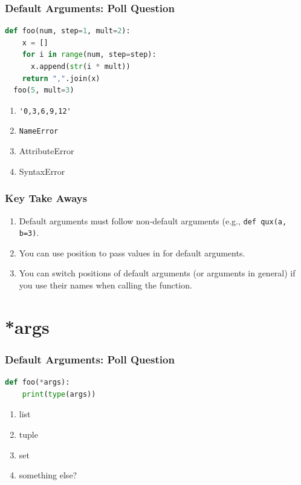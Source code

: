 \documentclass{beamer}
\begin{document}
%
%
\begin{frame}[fragile]
  \frametitle{Default Arguments: Poll Question}
  \begin{lstlisting}[language=Python, autogobble]
  def foo(num, step=1, mult=2):
    x = []
    for i in range(num, step=step):
      x.append(str(i * mult))
    return ",".join(x)
  foo(5, mult=3)
  \end{lstlisting}
  \vfill
  \begin{enumerate}[A]
    \item \lstinline|'0,3,6,9,12'|
    \item \lstinline|NameError|
    \item AttributeError
    \item SyntaxError
  \end{enumerate}
\end{frame}


%
%
\begin{frame}[fragile]
  \frametitle{Key Take Aways}
  \begin{enumerate}
      \pause
    \item Default arguments must follow non-default arguments (e.g., \lstinline|def qux(a, b=3)|.
      \pause
    \item You can use position to pass values in for default arguments.
      \pause
    \item You can switch positions of default arguments (or arguments in general) if you use their names when calling the function.
  \end{enumerate}
\end{frame}


\section{*args}

%
%
\begin{frame}[fragile]
  \frametitle{Default Arguments: Poll Question}
  \begin{lstlisting}[language=Python, autogobble]
  def foo(*args):
    print(type(args))
  \end{lstlisting}
  \vfill
  \begin{enumerate}[A]
    \item list
    \item tuple
    \item set
    \item something else?
  \end{enumerate}
\end{frame}
\end{document}
